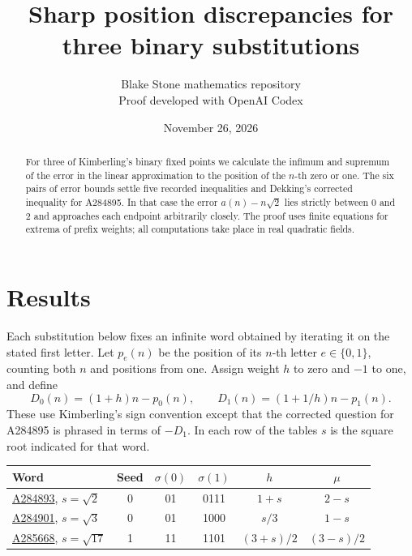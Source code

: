 \documentclass[11pt]{article}
\title{Sharp position discrepancies for three binary substitutions}
\author{Blake Stone mathematics repository\\[-2pt]\small Proof developed with OpenAI Codex}
\date{November 26, 2026}
\newcommand{\oeis}[1]{\href{https://oeis.org/#1}{\textup{#1}}}
\begin{document}
\maketitle
\begin{abstract}
For three of Kimberling's binary fixed points we calculate the infimum and
supremum of the error in the linear approximation to the position of the
$n$-th zero or one. The six pairs of error bounds settle five recorded
inequalities and Dekking's corrected inequality for A284895. In that case the
error $a(n)-n\sqrt2$ lies strictly between 0 and 2 and approaches each
endpoint arbitrarily closely. The proof uses finite equations for extrema of
prefix weights; all computations take place in real quadratic fields.
\end{abstract}

\section{Results}
Each substitution below fixes an infinite word obtained by iterating it on
the stated first letter. Let $p_e(n)$ be the position of its $n$-th letter
$e\in\{0,1\}$, counting both $n$ and positions from one. Assign weight $h$
to zero and $-1$ to one, and define
\[
 D_0(n)=(1+h)n-p_0(n),\qquad D_1(n)=(1+1/h)n-p_1(n).
\]
These use Kimberling's sign convention except that the corrected question
for A284895 is phrased in terms of $-D_1$. In each row of the tables $s$
is the square root indicated for that word.
\begin{center}
\begin{tabular}{@{}lccccc@{}}
\toprule
Word & Seed & $\sigma(0)$ & $\sigma(1)$ & $h$ & $\mu$\\
\midrule
\oeis{A284893}, $s=\sqrt2$ & 0 & 01 & 0111 & $1+s$ & $2-s$\\
\oeis{A284901}, $s=\sqrt3$ & 0 & 01 & 1000 & $s/3$ & $1-s$\\
\oeis{A285668}, $s=\sqrt{17}$ & 1 & 11 & 1101 & $(3+s)/2$ & $(3-s)/2$\\
\bottomrule
\end{tabular}
\end{center}
\end{document}
